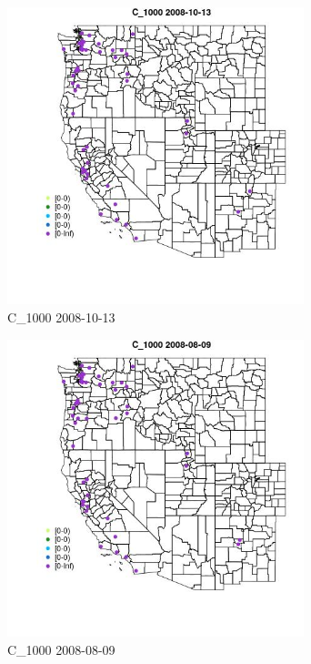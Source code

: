 \begin{figure} 
\centering  
\includegraphics[width=0.77\textwidth]{Code_Outputs/Report_ML_input_PM25_Step4_part_e_de_duplicated_aves_MapObsC_10002008-10-13.jpg} 
\caption{\label{fig:Report_ML_input_PM25_Step4_part_e_de_duplicated_avesMapObsC_10002008-10-13}C_1000 2008-10-13} 
\end{figure} 
 

\begin{figure} 
\centering  
\includegraphics[width=0.77\textwidth]{Code_Outputs/Report_ML_input_PM25_Step4_part_e_de_duplicated_aves_MapObsC_10002008-08-09.jpg} 
\caption{\label{fig:Report_ML_input_PM25_Step4_part_e_de_duplicated_avesMapObsC_10002008-08-09}C_1000 2008-08-09} 
\end{figure} 
 

